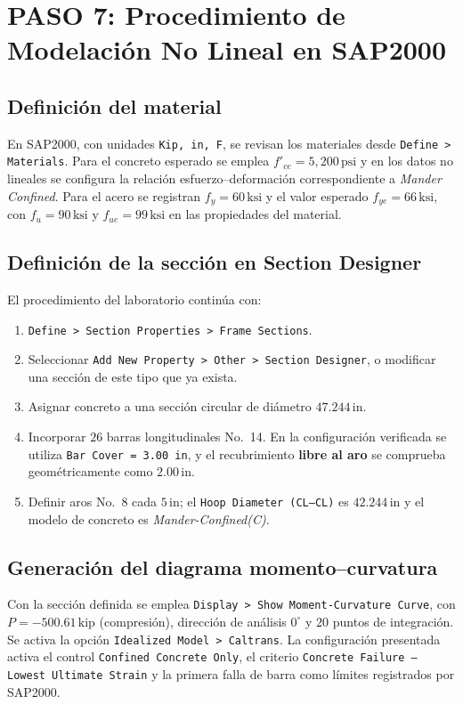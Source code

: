 \documentclass[11pt,a4paper]{article}
\begin{document}
\section{PASO 7: Procedimiento de Modelación No Lineal en SAP2000}

\subsection{Definición del material}
En SAP2000, con unidades \texttt{Kip, in, F}, se revisan los materiales
desde \texttt{Define > Materials}. Para el concreto esperado se emplea
$f'_{ce}=5{,}200\,\mathrm{psi}$ y en los datos no lineales se configura
la relación esfuerzo--deformación correspondiente a \textit{Mander Confined}.
Para el acero se registran $f_y=60\,\mathrm{ksi}$ y el valor esperado $f_{ye}=66\,\mathrm{ksi}$, con $f_u=90\,\mathrm{ksi}$ y $f_{ue}=99\,\mathrm{ksi}$ en las propiedades del material.

\subsection{Definición de la sección en Section Designer}
El procedimiento del laboratorio continúa con:
\begin{enumerate}
 \item \texttt{Define > Section Properties > Frame Sections}.
 \item Seleccionar \texttt{Add New Property > Other > Section Designer}, o modificar una sección de este tipo que ya exista.
 \item Asignar concreto a una sección circular de diámetro $47.244\,\mathrm{in}$.
 \item Incorporar $26$ barras longitudinales No.~14. En la configuración verificada se utiliza \texttt{Bar Cover = 3.00 in}, y el recubrimiento \textbf{libre al aro} se comprueba geométricamente como $2.00\,\mathrm{in}$.
 \item Definir aros No.~8 cada $5\,\mathrm{in}$; el \texttt{Hoop Diameter (CL--CL)} es $42.244\,\mathrm{in}$ y el modelo de concreto es \textit{Mander-Confined(C)}.
\end{enumerate}

\subsection{Generación del diagrama momento--curvatura}
Con la sección definida se emplea
\texttt{Display > Show Moment-Curvature Curve}, con
$P=-500.61\,\mathrm{kip}$ (compresión), dirección de análisis
$0^\circ$ y $20$ puntos de integración. Se activa la opción
\texttt{Idealized Model > Caltrans}.
La configuración presentada activa el control
\texttt{Confined Concrete Only}, el criterio
\texttt{Concrete Failure -- Lowest Ultimate Strain}
y la primera falla de barra como límites registrados por SAP2000.
\end{document}
